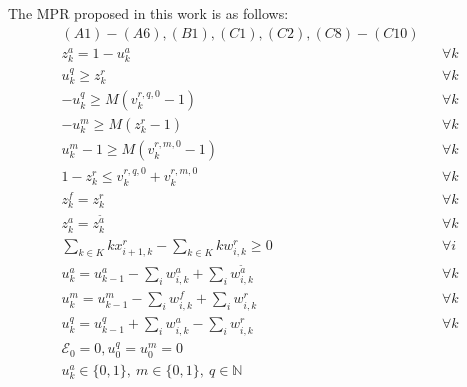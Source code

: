 \documentclass[]{interact}
\theoremstyle{plain}%
\theoremstyle{definition}
\theoremstyle{remark}
\begin{document}
The MPR proposed in this work is as follows: 
\begin{eqnarray}
(A1)-(A6),(B1),(C1),(C2),(C8)-(C10)\nonumber\\
z^{a}_{k} = 1-u^{a}_{k} &&\forall k \label{GG1:a1}\\
u^q_k \ge z^{r}_{k}&&\forall k \label{GG1:s1}\\
- u^q_k \ge M(v^{r,q,0}_k-1)&&\forall k \label{GG1:s2}\\
-u^m_k \ge M(z^{r}_{k}-1)&&\forall k \label{GG1:s3}\\
u^m_k - 1 \ge M(v^{r,m,0}_k-1)&&\forall k \label{GG1:s4}\\
1 - z^{r}_{k} \le v^{r,q,0}_k +v^{r,m,0}_k&&\forall k \label{GG1:s7}\\
z^{f}_{k} = z^{r}_{k}&&\forall k \label{GG1:f1}\\
z^{a}_{k}  = z^{\tilde{a}}_{k} &&\forall k \label{GG1:a2}\\
\sum_{k\in K} kx^{r}_{i+1,k} - \sum_{k\in K} kw^{r}_{i,k} \ge 0&&\forall i\label{GG1:s8}\\
u^{a}_k = u^{a}_{k-1} - \sum_{i}w^{a}_{i,k} + \sum_{i} w^{\tilde{a}}_{i,k} &&\forall k \label{GG1:E1}\\
u^{m}_k = u^{m}_{k-1} -  \sum_{i}w^{f}_{i,k} + \sum_{i} w^{r}_{i,k} &&\forall k \label{GG1:E4}\\
u^{q}_k = u^{q}_{k-1} +  \sum_{i}w^{a}_{i,k} -  \sum_{i}w^{r}_{i,k}&&\forall k \label{GG1:E5}\\
\mathcal{E}_0 = 0, u^q_0=u^m_0=0\nonumber\\
u^{a}_{k}\in\{0,1\},\ m\in\{0,1\},\ q\in \mathbb{N}
\end{eqnarray}
\end{document}
